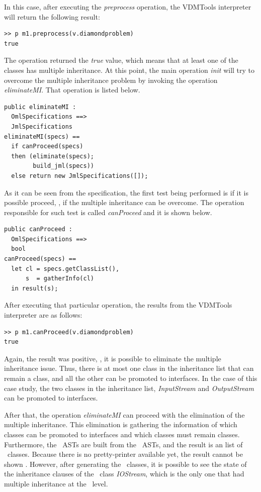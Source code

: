 In this case, after executing the \textit{preprocess} operation, the VDMTools interpreter will return the following result:

\lstset{style=Example}
\bigskip
\begin{lstlisting}
>> p m1.preprocess(v.diamondproblem)
true
\end{lstlisting}
\bigskip

The operation returned the \textit{true} value, which means that at least one of the classes has multiple inheritance. At this point, the main operation \textit{init} will try to overcome the multiple inheritance problem by invoking the operation \textit{eliminateMI}. That operation is listed below.

\lstset{style=mystyle}
\bigskip
\begin{lstlisting}
public eliminateMI : 
  OmlSpecifications ==>
  JmlSpecifications
eliminateMI(specs) == 
  if canProceed(specs)
  then (eliminate(specs);
        build_jml(specs))
  else return new JmlSpecifications([]);
\end{lstlisting}
\bigskip

As it can be seen from the specification, the first test being performed is if it is possible proceed, \ie, if the multiple inheritance can be overcome. The operation responsible for such test is called \textit{canProceed} and it is shown below.

\bigskip
\begin{lstlisting}
public canProceed : 
  OmlSpecifications ==>
  bool
canProceed(specs) == 
  let cl = specs.getClassList(),
      s  = gatherInfo(cl)
  in result(s);
\end{lstlisting}
\bigskip

After executing that particular operation, the results from the VDMTools interpreter are as follows:

\lstset{style=Example}
\bigskip
\begin{lstlisting}
>> p m1.canProceed(v.diamondproblem)
true
\end{lstlisting}
\bigskip

Again, the result was positive, \ie, it is possible to eliminate the multiple inheritance issue. Thus, there is at most one class in the inheritance list that can remain a class, and all the other can be promoted to interfaces. In the case of this case study, the two classes in the inheritance list, \textit{InputStream} and \textit{OutputStream} can be promoted to interfaces. 

After that, the operation \textit{eliminateMI} can proceed with the elimination of the multiple inheritance. This elimination is gathering the information of which classes can be promoted to interfaces and which classes must remain classes. Furthermore, the \jml\ ASTs are built from the \vpp\ ASTs, and the result is an list of \jml\ classes. Because there is no pretty-printer available yet, the result cannot be shown . However, after generating the \jml\ classes, it is possible to see the state of the inheritance clauses of the \jml\ class \textit{IOStream}, which is the only one that had multiple inheritance at the \vpp\ level.

